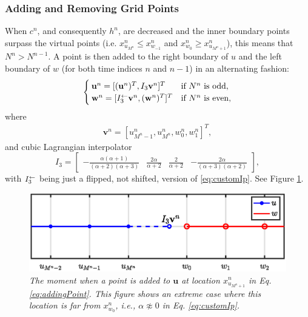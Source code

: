\subsubsection{Adding and Removing Grid Points}\label{sec:addRemove}
When $c^n$, and consequently $h^n$, are decreased and the inner boundary points surpass the virtual points (i.e. $x_{u_{M^n}}^n \leq x_{w_{-1}}^n$ and $x_{w_0}^n \geq x_{u_{M^n+1}}^n$), this means that $N^n >  N^{n-1}$. A point is then added to the right boundary of $u$ and the left boundary of $w$ (for both time indices $n$ and $n-1$) in an alternating fashion: 
\begin{equation}\label{eq:addingPoint}
        \begin{cases}\mathbf{u}^n = [(\mathbf{u}^n)^T, I_3\mathbf{v}^n]^T & \text{if $N^n $ is odd},\\
        \mathbf{w}^n = [I_3^\leftarrow\mathbf{v}^n, (\mathbf{w}^n)^T]^T & \text{if $ N^n$ is even},
        \end{cases}
\end{equation}
where 
\begin{align*}
\mathbf{v}^n = [u_{M^n-1}^n, u_{M^n}^n, w_0^n, w_1^n]^T,%
\end{align*}
and cubic Lagrangian interpolator
\begin{equation}\label{eq:customIp}
    I_3 = \begin{bmatrix} -\frac{\alpha(\alpha+1)}{(\alpha+2)(\alpha+3)} &\frac{2\alpha}{\alpha+2} &\frac{2}{\alpha+2} 
    &-\frac{2\alpha}{(\alpha+3)(\alpha+2)}
    \end{bmatrix},
\end{equation}
with $I_3^\leftarrow$ being just a flipped, not shifted, version of \eqref{eq:customIp}.
See Figure \ref{fig:addingPoint}.
%
\begin{figure}[t]
    \centering
\includegraphics[width=\figwidth\columnwidth]{Figures/addingGridPointNarrow.eps}
\caption{\label{fig:addingPoint}{\it The moment when a point is added to $\mathbf{u}$ at location $x_{u_{M^n+1}}^n$ in Eq. \eqref{eq:addingPoint}. This figure shows an extreme case where this location is far from $x_{w_0}^n$, i.e., $\alpha \not\approx 0$ in Eq. \eqref{eq:customIp}.}}
\end{figure}
